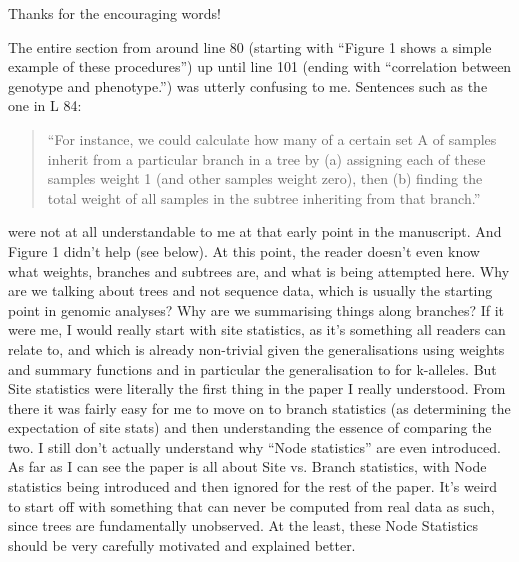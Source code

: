 Thanks for the encouraging words!

\begin{point}{}
The entire section from around line 80 (starting with ``Figure 1 shows a simple example of these procedures'') up until line 101 (ending with ``correlation between genotype and phenotype.'') was utterly confusing to me. Sentences such as the one in L 84:
    \begin{quote}
``For instance, we could calculate how many of a certain set A of samples inherit from a particular branch in a tree by (a) assigning each of these samples weight 1 (and other samples weight zero), then (b) finding the total weight of all samples in the subtree inheriting from that branch.''
    \end{quote}
were not at all understandable to me at that early point in the manuscript. And Figure 1 didn't help (see below). At this point, the reader doesn't even know what weights, branches and subtrees are, and what is being attempted here. Why are we talking about trees and not sequence data, which is usually the starting point in genomic analyses? Why are we summarising things along branches? If it were me, I would really start with site statistics, as it's something all readers can relate to, and which is already non-trivial given the generalisations using weights and summary functions and in particular the generalisation to for k-alleles. But Site statistics were literally the first thing in the paper I really understood. From there it was fairly easy for me to move on to branch statistics (as determining the expectation of site stats) and then understanding the essence of comparing the two. I still don't actually understand why ``Node statistics'' are even introduced. As far as I can see the paper is all about Site vs. Branch statistics, with Node statistics being introduced and then ignored for the rest of the paper. It's weird to start off with something that can never be computed from real data as such, since trees are fundamentally unobserved. At the least, these Node Statistics should be very carefully motivated and explained better.
\end{point}

\reply{
}

